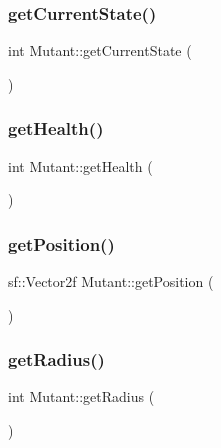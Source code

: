 \mbox{\label{class_mutant_a07b88089382dcc84f261ee3d3d9a009b}} 
\subsubsection{\texorpdfstring{get\+Current\+State()}{getCurrentState()}}
{\footnotesize\ttfamily int Mutant\+::get\+Current\+State (\begin{DoxyParamCaption}{ }\end{DoxyParamCaption})}

\mbox{\label{class_mutant_ae80452778ea58cf79ff76a1a481712af}} 
\subsubsection{\texorpdfstring{get\+Health()}{getHealth()}}
{\footnotesize\ttfamily int Mutant\+::get\+Health (\begin{DoxyParamCaption}{ }\end{DoxyParamCaption})}

\mbox{\label{class_mutant_ab20f22800bae3c7587beb641248412ac}} 
\subsubsection{\texorpdfstring{get\+Position()}{getPosition()}}
{\footnotesize\ttfamily sf\+::\+Vector2f Mutant\+::get\+Position (\begin{DoxyParamCaption}{ }\end{DoxyParamCaption})}

\mbox{\label{class_mutant_afb53c9562d5e98d5f6749024d09d132e}} 
\subsubsection{\texorpdfstring{get\+Radius()}{getRadius()}}
{\footnotesize\ttfamily int Mutant\+::get\+Radius (\begin{DoxyParamCaption}{ }\end{DoxyParamCaption})}

